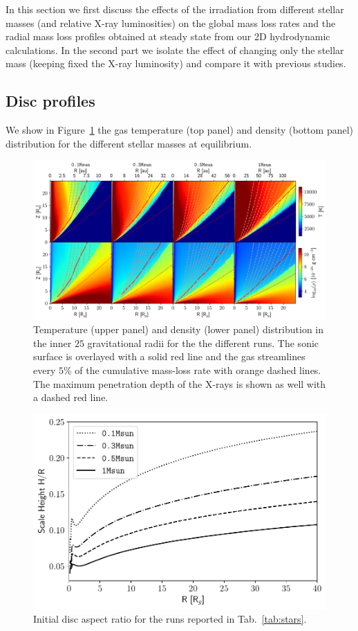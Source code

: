 \documentclass[usenatbib,useAMS,usedcolumn]{mnras}
\begin{document}
In this section we first discuss the effects of the irradiation from different stellar masses (and relative X-ray luminosities) on the global mass loss rates and the radial mass loss profiles obtained at steady state from our 2D hydrodynamic calculations. In the second part we isolate the effect of changing only the stellar mass (keeping fixed the X-ray luminosity) and compare it with previous studies.

\subsection{Disc profiles}
We show in Figure~\ref{fig:discs} the gas temperature (top panel) and density (bottom panel) distribution for the different stellar masses at equilibrium.
\begin{figure}
    \centering
    \includegraphics[width=\textwidth]{Figure4}
    \caption{Temperature (upper panel) and density (lower panel) distribution in the inner $25$ gravitational radii for the the different runs. The sonic surface is overlayed with a solid red line and the gas streamlines every $5\%$ of the cumulative mass-loss rate with orange dashed lines. The maximum penetration depth of the X-rays is shown as well with a dashed red line. \label{fig:discs}}
\end{figure}
\begin{figure}
    \centering
    \includegraphics[width=\columnwidth]{Figure5}
    \caption{Initial disc aspect ratio for the runs reported in Tab.~\ref{tab:stars}. \label{fig:aspectratio}}
\end{figure}
\end{document}
